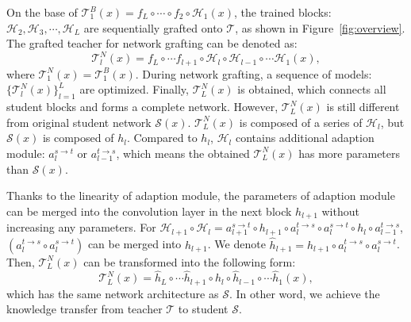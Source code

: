 \documentclass[letterpaper]{article} %
\begin{document}
{{        On the base of $\mathcal{T}_1^B(x) = f_L \circ \cdots \circ f_2 \circ \mathcal{H}_1(x)$, the trained blocks: $\mathcal{H}_2, \mathcal{H}_3, \cdots, \mathcal{H}_L$ are sequentially grafted onto $\mathcal{T}$, as shown in Figure~\ref{fig:overview}.
        The grafted teacher for network grafting can be denoted as:
        \begin{equation} \label{eq:net_graft}
            \mathcal{T}_l^N(x) = f_L \circ \cdots f_{l+1} \circ \mathcal{H}_l \circ \mathcal{H}_{l-1} \circ \cdots \mathcal{H}_1(x),
        \end{equation}
        where $\mathcal{T}_1^N(x) = \mathcal{T}_1^B(x)$.
        During network grafting, a sequence of models: $\{\mathcal{T}_l^N(x)\}_{l=1}^L$ are optimized.
        Finally, $\mathcal{T}_L^N(x)$ is obtained, which connects all student blocks and forms a complete network.
        However, $\mathcal{T}_L^N(x)$ is still different from original student network $\mathcal{S}(x)$.
        $\mathcal{T}_L^N(x)$ is composed of a series of $\mathcal{H}_l$, but $\mathcal{S}(x)$ is composed of $h_l$.
        Compared to $h_l$, $\mathcal{H}_l$ contains additional adaption module: $a_{l}^{s \rightarrow t}$ or $a_{l-1}^{t \rightarrow s}$, which means the obtained $\mathcal{T}_L^N(x)$ has more parameters than $\mathcal{S}(x)$.

        Thanks to the linearity of adaption module, the parameters of adaption module can be merged into the convolution layer in the next block $h_{l+1}$ without increasing any parameters.
        For $\mathcal{H}_{l+1} \circ \mathcal{H}_l = a_{l+1}^{s \rightarrow t}\circ h_{l+1} \circ a_{l}^{t \rightarrow s} \circ a_{l}^{s \rightarrow t}\circ h_l \circ a_{l-1}^{t \rightarrow s}$, $(a_{l}^{t \rightarrow s} \circ a_{l}^{s \rightarrow t})$ can be merged into $h_{l+1}$. We denote $\hat{h}_{l+1} = h_{l+1} \circ a_{l}^{t \rightarrow s} \circ a_{l}^{s \rightarrow t}$.
        Then, $\mathcal{T}_L^N(x)$ can be transformed into the following form:
        \begin{equation} \label{eq:final_net_graft}
            \mathcal{T}_L^N(x) = \hat{h}_L \circ \cdots \hat{h}_{l+1} \circ \hat{h}_l \circ \hat{h}_{l-1} \circ \cdots \hat{h}_1(x),
        \end{equation}
        which has the same network architecture as $\mathcal{S}$.
        In other word, we achieve the knowledge transfer from teacher $\mathcal{T}$ to student $\mathcal{S}$.


    }

}
\end{document}
